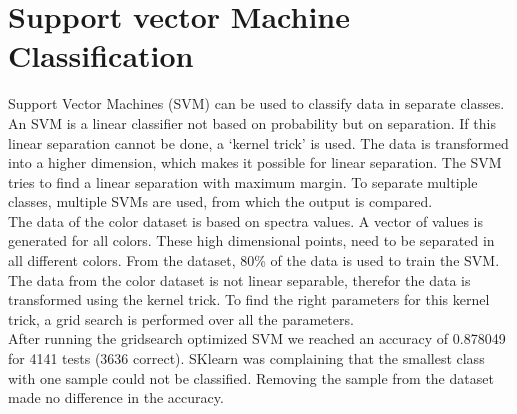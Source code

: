\documentclass[a4paper,12px]{article}
\begin{document}

\section{Support vector Machine Classification}


%
%
%
%
%
%

Support Vector Machines (SVM) can be used to classify data in separate classes.
An SVM is a linear classifier not based on probability but on separation.  If
this linear separation cannot be done, a `kernel trick' is used. The data is
transformed into a higher dimension, which makes it possible for linear
separation. The SVM tries to find a linear separation with maximum margin. To
separate multiple classes, multiple SVMs are used, from which the output is
compared.\\

The data of the color dataset is based on spectra values. A vector of values is
generated for all colors. These high dimensional points, need to be separated in
all different colors. From the dataset, 80\% of the data is used to train the
SVM\@. The data from the color dataset is not linear separable, therefor the
data is transformed using the kernel trick. To find the right parameters for
this kernel trick, a grid search is performed over all the parameters.\\

After running the gridsearch optimized SVM we reached an accuracy of 0.878049
for 4141 tests (3636 correct). SKlearn was complaining that the smallest class
with one sample could not be classified. Removing the sample from the dataset
made no difference in the accuracy.


% 
% 
\end{document}
